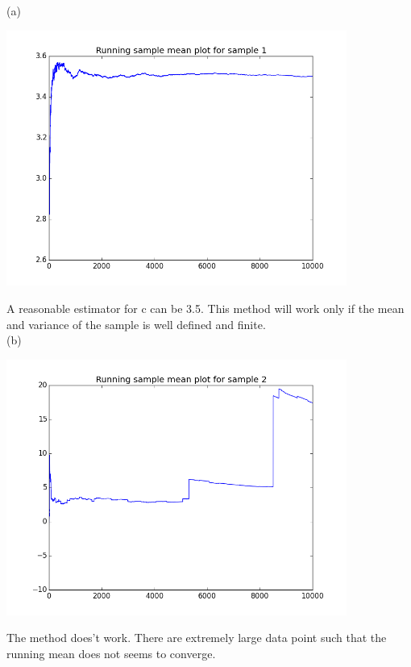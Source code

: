 \documentclass[11pt]{article}
\newenvironment{problem}[2][Problem]{\begin{trivlist}
\item[\hskip \labelsep {\bfseries #1}\hskip \labelsep {\bfseries #2.}]}{\end{trivlist}}
\begin{document}
\begin{problem}{4}
\end{problem}
(a)

\begin{centering}
\includegraphics[height = 3.3in]{Q4_a} 

\end{centering}

A reasonable estimator for c can be 3.5. This method will work only if the mean and variance of the sample is well defined and finite.\\
(b)

\begin{centering}
	\includegraphics[height = 3.3in]{Q4_b} 
	
\end{centering}
The method does't work. There are extremely large data point such that the running mean does not seems to converge.\\
\end{document}
